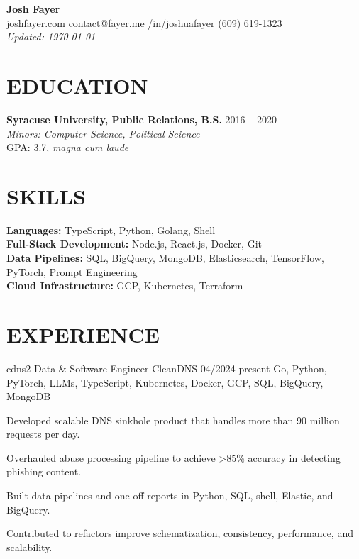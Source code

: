 \documentclass[letterpaper,10pt]{article}
\begin{document}
\begin{center}
    {\huge\textbf{Josh Fayer}} \\
        \href{https://joshfayer.com}{joshfayer.com} \quad
        \href{mailto:contact@fayer.me}{contact@fayer.me} \quad
        \href{https://linkedin.com/in/joshuafayer}{/in/joshuafayer} \quad (609) 619-1323 \\
        \emph{Updated: \monthyear\today}
\end{center}

\vspace{0.1cm}

\section*{EDUCATION}
\noindent\textbf{Syracuse University, Public Relations, B.S.} \hfill 2016 -- 2020 \\
\emph{Minors: Computer Science, Political Science} \\
GPA: 3.7, \emph{magna cum laude}

\section*{SKILLS}
\noindent\textbf{Languages:} TypeScript, Python, Golang, Shell \\
\noindent\textbf{Full-Stack Development:} Node.js, React.js, Docker, Git \\
\noindent\textbf{Data Pipelines:} SQL, BigQuery, MongoDB, Elasticsearch, TensorFlow, PyTorch, Prompt Engineering \\
\textbf{Cloud Infrastructure:} GCP, Kubernetes, Terraform

\section*{EXPERIENCE}

\jobentry
    {cdns2}
    {Data \& Software Engineer}
    {CleanDNS}
    {04/2024-present}
    {Go, Python, PyTorch, LLMs, TypeScript, Kubernetes, Docker, GCP, SQL, BigQuery, MongoDB}
    {
        \item Developed scalable DNS sinkhole product that handles more than 90 million requests per day.
        \item Overhauled abuse processing pipeline to achieve >85\% accuracy in detecting phishing content.
        \item Built data pipelines and one-off reports in Python, SQL, shell, Elastic, and BigQuery.
        \item Contributed to refactors improve schematization, consistency, performance, and scalability.
    }
\end{document}

